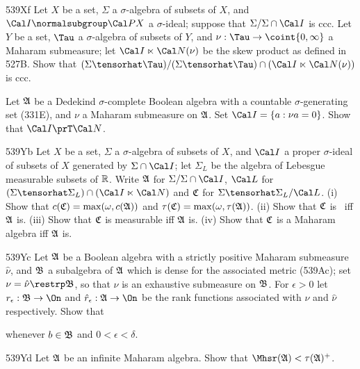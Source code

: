{\spheader 539Xf Let $X$ be a set, $\Sigma$ a $\sigma$-algebra of
subsets of $X$, and $\Cal I\normalsubgroup\Cal PX$ a $\sigma$-ideal;
suppose that $\Sigma/\Sigma\cap\Cal I$ is ccc.
Let $Y$ be a set, $\Tau$ a $\sigma$-algebra of subsets of $Y$, and
$\nu:\Tau\to\coint{0,\infty}$ a Maharam submeasure;
let $\Cal I\ltimes\Cal N(\nu)$ be the skew product
as defined in 527B.   Show that $(\Sigma\tensorhat\Tau)
/(\Sigma\tensorhat\Tau)\cap(\Cal I\ltimes\Cal N(\nu))$ is ccc.

Let $\frak A$ be a Dedekind $\sigma$-complete Boolean
algebra with a countable $\sigma$-generating set (331E), and $\nu$
a Maharam submeasure on $\frak A$.   Set $\Cal I=\{a:\nu a=0\}$.
Show that $\Cal I\prT\Cal N$.

\spheader 539Yb
Let $X$ be a set, $\Sigma$ a $\sigma$-algebra of subsets of
$X$, and $\Cal I$ a proper $\sigma$-ideal of subsets of $X$ generated by
$\Sigma\cap\Cal I$;  let $\Sigma_L$ be the algebra of Lebesgue measurable
subsets of $\Bbb R$.   Write $\frak A$ for $\Sigma/\Sigma\cap\Cal I$,
$\Cal L$ for $(\Sigma\tensorhat\Sigma_L)\cap(\Cal I\ltimes\Cal N)$ and
$\frak C$ for $\Sigma\tensorhat\Sigma_L/\Cal L$.
(i) Show that $c(\frak C)=\max(\omega,c(\frak A))$ and
$\tau(\frak C)=\max(\omega,\tau(\frak A))$.
(ii) Show that $\frak C$ is \wsid\ iff $\frak A$ is.
(iii) Show that $\frak C$ is measurable iff $\frak A$ is.
(iv) Show that $\frak C$ is a Maharam algebra iff $\frak A$ is.

\spheader 539Yc Let $\frak A$ be a Boolean algebra with a
strictly positive Maharam submeasure $\hat\nu$, and $\frak B$ a
subalgebra of $\frak A$ which is dense for the associated metric (539Ac);
set $\nu=\hat\nu\restrp\frak B$, so
that $\nu$ is an exhaustive submeasure on $\frak B$.   For $\epsilon>0$ let
$r_{\epsilon}:\frak B\to\On$ and
$\hat r_{\epsilon}:\frak A\to\On$ be the rank functions
associated with $\nu$ and $\hat\nu$ respectively.   Show that


\noindent whenever $b\in\frak B$ and $0<\epsilon<\delta$.

\spheader 539Yd Let $\frak A$ be an infinite Maharam algebra.
Show that $\Mhsr(\frak A)<\tau(\frak A)^+$.

}
